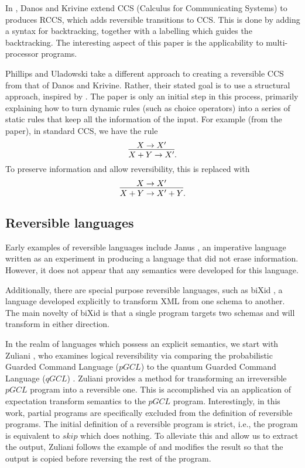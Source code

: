 In \cite{danos2004reversible}, Danos and Krivine extend CCS (Calculus for Communicating Systems)
\cite{milner1980calculus,milner1989communication} to produces RCCS, which adds reversible
transitions to CCS. This is done by adding a syntax for backtracking, together with a labelling
which guides the backtracking. The interesting aspect of this paper is the applicability to
multi-processor programs.

Phillips and Uladowski \cite{phillips2006operational} take a different approach to creating a
reversible CCS from that of Danos and Krivine. Rather, their stated goal is to use a structural
approach, inspired by \cite{abramsky05:reversible}. The paper is only an initial step in this
process, primarily explaining how to turn dynamic rules (such as choice operators) into a series of
static rules that keep all the information of the input. For example (from the paper), in standard
CCS, we have the rule
\[
  \infer{X+Y \to X'}{X\to X'}.
\]
To preserve information and allow reversibility, this is replaced with
\[
  \infer{X+Y \to X' +Y}{X\to X'}.
\]


\subsection{Reversible languages}
\label{subsec:reversible_languages}

Early examples of reversible languages include Janus \cite{lutz1986janus}, an imperative language
written as an experiment in producing a language that did not erase information. However, it does
not appear that any semantics were developed for this language.

Additionally, there are special purpose reversible languages, such as biXid \cite{bixid06}, a
language developed explicitly to transform XML \cite{xml} from one schema to another. The main
novelty of biXid is that a single program targets two schemas and will transform in either direction.

In the realm of languages which possess an explicit semantics, we start with Zuliani
\cite{zuliani01:reversibility}, who examines logical reversibility via comparing the probabilistic
Guarded Command Language ($pGCL$) \cite{MorganIver99} to the quantum Guarded Command Language
($qGCL$) \cite{sanders:quantum}. Zuliani provides a method for transforming an irreversible $pGCL$
program into a reversible one. This is accomplished via an application of expectation transform
semantics to the $pGCL$ program. Interestingly, in this work, partial programs are specifically
excluded from the definition of reversible programs. The initial definition of a reversible program
is strict, i.e., the program is equivalent to $skip$ which does nothing. To alleviate this and allow
us to extract the output, Zuliani follows the example of \cite{bennett:1973reverse} and modifies the
result so that the output is copied before reversing the rest of the program.


